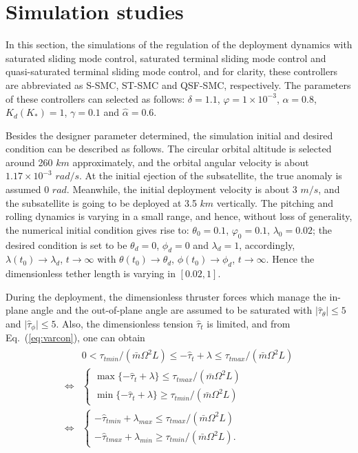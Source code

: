 \documentclass[Journal,letterpaper]{ascelike-new}
\theoremstyle{plain}
\theoremstyle{remark}
\begin{document}
\section{Simulation studies}\label{sec:4}
In this section, the simulations of the regulation of the deployment dynamics with saturated sliding mode control, saturated terminal sliding mode control and quasi-saturated terminal sliding mode control, and for clarity, these controllers are abbreviated as S-SMC, ST-SMC and QSF-SMC, respectively. The parameters of these controllers can selected as follows: $\delta=1.1$, $\varphi= 1\times 10^{-3}$, $\alpha = 0.8$, $K_d(K_{*})=1$, $\gamma = 0.1$ and $\hat\alpha=0.6$.\par
Besides the designer parameter determined, the simulation initial and desired condition can be described as follows. The circular orbital altitude is selected around 260 $km$ approximately, and the orbital angular velocity is about $1.17\times 10^{-3}$ $rad/s$. At the initial ejection of the subsatellite, the true anomaly is assumed 0 $rad$. Meanwhile, the initial deployment velocity is about 3 $m/s$, and the subsatellite is going to be deployed at 3.5 $km$ vertically. The pitching and rolling dynamics is varying in a small range, and hence, without loss of generality, the numerical initial condition gives rise to: $\theta_0 = 0.1$, $\varphi_0 = 0.1$, $\lambda_0 = 0.02$; the desired condition is set to be $\theta_d = 0$, $\phi_d = 0$ and $\lambda_d = 1$, accordingly, $\lambda(t_0)\rightarrow\lambda_d$, $t\rightarrow\infty$ with $\theta(t_0)\rightarrow\theta_d$, $\phi(t_0)\rightarrow\phi_d$, $t\rightarrow\infty$. Hence the dimensionless tether length is varying in $[0.02,1]$.\par
During the deployment, the dimensionless thruster forces which manage the in-plane angle and the out-of-plane angle are assumed to be saturated with $\vert\hat\tau_{\theta}\vert\le5 $ and $\vert\hat\tau_{\phi}\vert\le 5$. Also, the dimensionless tension $\hat\tau_t$ is limited, and from Eq.~(\ref{eq:varcon}), one can obtain
\begin{align}
\begin{split}
&0<\tau_{tmin}/(\bar{m}\Omega^2L)\le-\hat\tau_t+\lambda\le\tau_{tmax}/(\bar{m}\Omega^2L)\\
\Leftrightarrow
&\begin{cases}
\max\{-\hat\tau_t+\lambda\}\le\tau_{tmax}/(\bar{m}\Omega^2L)\\
\min\{-\hat\tau_t+\lambda\}\ge\tau_{tmin}/(\bar{m}\Omega^2L)
\end{cases}\\
\Leftrightarrow
&\begin{cases}
-\hat\tau_{tmin}+\lambda_{max}\le\tau_{tmax}/(\bar{m}\Omega^2L)\\
-\hat\tau_{tmax}+\lambda_{min}\ge\tau_{tmin}/(\bar{m}\Omega^2L).
\end{cases}
\end{split}
\end{align}
\end{document}
